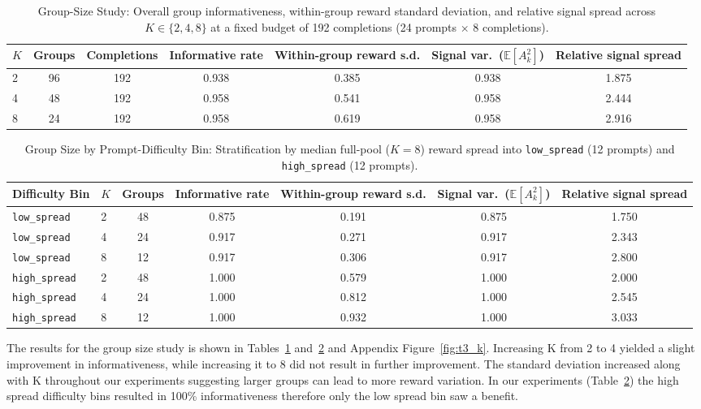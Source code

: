 \documentclass{article}
\begin{document}
\begin{table}[htbp]
    \centering
    \caption{Group-Size Study: Overall group informativeness, within-group reward standard deviation, and relative signal spread across $K \in \{2, 4, 8\}$ at a fixed budget of 192 completions (24 prompts $\times$ 8 completions).}
    \label{tab:t3_group_size}
    \small
    \begin{tabular}{lcccccc}
        \toprule
        $K$ & Groups & Completions & Informative rate & Within-group reward s.d. & Signal var.\ ($\mathbb{E}[A_k^2]$) & Relative signal spread \\
        \midrule
        2 & 96 & 192 & 0.938 & 0.385 & 0.938 & 1.875 \\
        4 & 48 & 192 & 0.958 & 0.541 & 0.958 & 2.444 \\
        8 & 24 & 192 & 0.958 & 0.619 & 0.958 & 2.916 \\
        \bottomrule
    \end{tabular}
\end{table}

\begin{table}[htbp]
    \centering
    \caption{Group Size by Prompt-Difficulty Bin: Stratification by median full-pool ($K=8$) reward spread into \texttt{low\_spread} (12 prompts) and \texttt{high\_spread} (12 prompts).}
    \label{tab:t3_bins}
    \small
    \begin{tabular}{llccccc}
        \toprule
        Difficulty Bin & $K$ & Groups & Informative rate & Within-group reward s.d. & Signal var.\ ($\mathbb{E}[A_k^2]$) & Relative signal spread \\
        \midrule
        \texttt{low\_spread} & 2 & 48 & 0.875 & 0.191 & 0.875 & 1.750 \\
        \texttt{low\_spread} & 4 & 24 & 0.917 & 0.271 & 0.917 & 2.343 \\
        \texttt{low\_spread} & 8 & 12 & 0.917 & 0.306 & 0.917 & 2.800 \\
        \midrule
        \texttt{high\_spread} & 2 & 48 & 1.000 & 0.579 & 1.000 & 2.000 \\
        \texttt{high\_spread} & 4 & 24 & 1.000 & 0.812 & 1.000 & 2.545 \\
        \texttt{high\_spread} & 8 & 12 & 1.000 & 0.932 & 1.000 & 3.033 \\
        \bottomrule
    \end{tabular}
\end{table}

 The results for the group size study is shown in Tables~\ref{tab:t3_group_size} and~\ref{tab:t3_bins} and Appendix Figure~\ref{fig:t3_k}. Increasing K from 2 to 4 yielded a slight improvement in informativeness, while increasing it to 8 did not result in further improvement. The standard deviation increased along with K throughout our experiments suggesting larger groups can lead to more reward variation. 
 In our experiments (Table~\ref{tab:t3_bins}) the high spread difficulty bins resulted in 100\% informativeness therefore only the low spread bin  saw a benefit.
 
\end{document}
